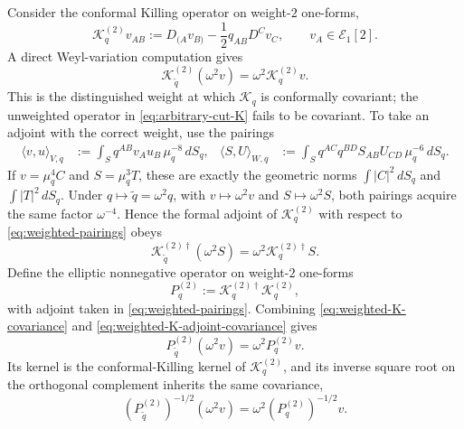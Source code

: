 \documentclass[11pt,a4paper]{article}
\begin{document}
Consider the conformal Killing operator on weight-\(2\) one-forms,
\begin{equation}\label{eq:weighted-K}
  \mathcal K_q^{(2)}v_{AB}
  :=
  D_{(A}v_{B)}-\frac12q_{AB}D^Cv_C ,
  \qquad v_A\in\mathcal E_1[2].
\end{equation}
A direct Weyl-variation computation gives
\begin{equation}\label{eq:weighted-K-covariance}
  \mathcal K_{\tilde q}^{(2)}(\omega^2v)
  =
  \omega^2\mathcal K_q^{(2)}v .
\end{equation}
This is the distinguished weight at which \(\mathcal K_q\) is conformally covariant; the unweighted operator in \eqref{eq:arbitrary-cut-K} fails to be covariant.  To take an adjoint with the correct weight, use the pairings
\begin{align}\label{eq:weighted-pairings}
  \langle v,u\rangle_{V,q}
  &:=
  \int_S q^{AB}v_Au_B\,\mu_q^{-8}\,dS_q ,
  &
  \langle S,U\rangle_{W,q}
  &:=
  \int_S q^{AC}q^{BD}S_{AB}U_{CD}\,\mu_q^{-6}\,dS_q .
\end{align}
If \(v=\mu_q^4C\) and \(S=\mu_q^3T\), these are exactly the geometric norms
\(\int|C|^2\,dS_q\) and \(\int|T|^2\,dS_q\).  Under
\(q\mapsto\tilde q=\omega^2q\), with \(v\mapsto\omega^2v\) and
\(S\mapsto\omega^2S\), both pairings acquire the same factor \(\omega^{-4}\).  Hence the formal adjoint of \(\mathcal K_q^{(2)}\) with respect to \eqref{eq:weighted-pairings} obeys
\begin{equation}\label{eq:weighted-K-adjoint-covariance}
  \mathcal K_{\tilde q}^{(2)\dagger}(\omega^2S)
  =
  \omega^2\mathcal K_q^{(2)\dagger}S .
\end{equation}
Define the elliptic nonnegative operator on weight-\(2\) one-forms
\begin{equation}\label{eq:weighted-P}
  P_q^{(2)}
  :=
  \mathcal K_q^{(2)\dagger}\mathcal K_q^{(2)} ,
\end{equation}
with adjoint taken in \eqref{eq:weighted-pairings}.  Combining
\eqref{eq:weighted-K-covariance} and
\eqref{eq:weighted-K-adjoint-covariance} gives
\begin{equation}\label{eq:weighted-P-covariance}
  P_{\tilde q}^{(2)}(\omega^2v)
  =
  \omega^2P_q^{(2)}v .
\end{equation}
Its kernel is the conformal-Killing kernel of \(\mathcal K_q^{(2)}\), and its inverse square root on the orthogonal complement inherits the same covariance,
\begin{equation}\label{eq:weighted-P-inverse-covariance}
  (P_{\tilde q}^{(2)})^{-1/2}(\omega^2v)
  =
  \omega^2(P_q^{(2)})^{-1/2}v .
\end{equation}
\end{document}
